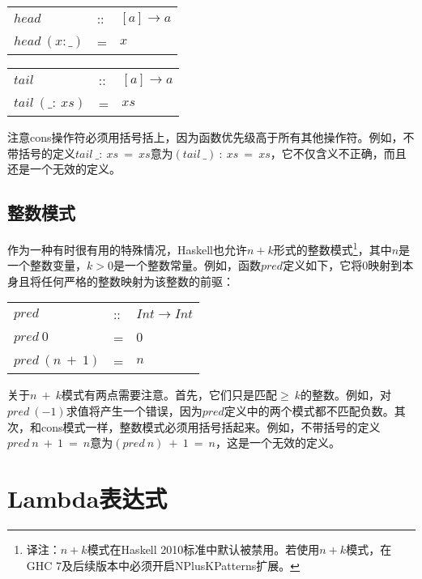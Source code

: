 \begin{tabular}[t]{lll}
$head$&::&$[a] \rightarrow a$\\
$head~(x:\_)$&=&$x$\\
\end{tabular}

\begin{tabular}[t]{lll}
$tail$&::&$[a] \rightarrow a$\\
$tail~(\_:~xs)$&=&$xs$\\
\end{tabular}

注意cons操作符必须用括号括上，因为函数优先级高于所有其他操作符。例如，不带括号的定义$tail~\_:~xs~=~xs$意为$(tail~\_)~:~xs~=~xs$，它不仅含义不正确，而且还是一个无效的定义。

\subsection*{整数模式}
作为一种有时很有用的特殊情况，Haskell也允许$n + k$形式的整数模式\footnote{译注：$n+k$模式在Haskell 2010标准中默认被禁用。若使用$n+k$模式，在GHC 7及后续版本中必须开启NPlusKPatterns扩展。}，其中$n$是一个整数变量，$k > 0$是一个整数常量。例如，函数$pred$定义如下，它将0映射到本身且将任何严格的整数映射为该整数的前驱：

\begin{tabular}[t]{lll}
$pred$&::&$Int \rightarrow Int$\\
$pred~0$&=&$0$\\
$pred~(n~+~1)$&=&$n$\\
\end{tabular}

关于$n~+~k$模式有两点需要注意。首先，它们只是匹配$\geq ~k$的整数。例如，对$pred~(-1)$求值将产生一个错误，因为$pred$定义中的两个模式都不匹配负数。其次，和cons模式一样，整数模式必须用括号括起来。例如，不带括号的定义$pred~n~+~1~=~n$意为$(pred~n)~+~1~=~n$，这是一个无效的定义。

\section{Lambda表达式}


